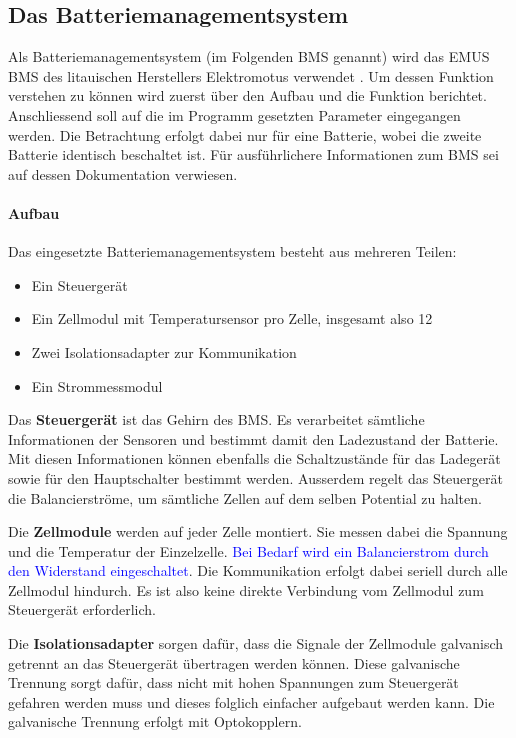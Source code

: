 \subsection{Das Batteriemanagementsystem}

Als Batteriemanagementsystem (im Folgenden BMS genannt) wird das EMUS BMS des litauischen Herstellers Elektromotus verwendet \cite{emus}. Um dessen Funktion verstehen zu können wird zuerst über den Aufbau und die Funktion berichtet. Anschliessend soll auf die im Programm gesetzten Parameter eingegangen werden. Die Betrachtung erfolgt dabei nur für eine Batterie, wobei die zweite Batterie identisch beschaltet ist. Für ausführlichere Informationen zum BMS sei auf dessen Dokumentation \cite{bms} verwiesen.

\paragraph{Aufbau}
Das eingesetzte Batteriemanagementsystem besteht aus mehreren Teilen: \begin{itemize}
	\item Ein Steuergerät
	\item Ein Zellmodul mit Temperatursensor pro Zelle, insgesamt also 12
	\item Zwei Isolationsadapter zur Kommunikation
	\item Ein Strommessmodul
\end{itemize}

Das \textbf{Steuergerät} ist das Gehirn des BMS. Es verarbeitet sämtliche Informationen der Sensoren und bestimmt damit den Ladezustand der Batterie. Mit diesen Informationen können ebenfalls die Schaltzustände für das Ladegerät sowie für den Hauptschalter bestimmt werden. Ausserdem regelt das Steuergerät die Balancierströme, um sämtliche Zellen auf dem selben Potential zu halten.

Die \textbf{Zellmodule} werden auf jeder Zelle montiert. Sie messen dabei die Spannung und die Temperatur der Einzelzelle. \textcolor{blue}{Bei Bedarf wird ein Balancierstrom durch den Widerstand eingeschaltet}. Die Kommunikation erfolgt dabei seriell durch alle Zellmodul hindurch. Es ist also keine direkte Verbindung vom Zellmodul zum Steuergerät erforderlich.

Die \textbf{Isolationsadapter} sorgen dafür, dass die Signale der Zellmodule galvanisch getrennt an das Steuergerät übertragen werden können. Diese galvanische Trennung sorgt dafür, dass nicht mit hohen Spannungen zum Steuergerät gefahren werden muss und dieses folglich einfacher aufgebaut werden kann. Die galvanische Trennung erfolgt mit Optokopplern.

